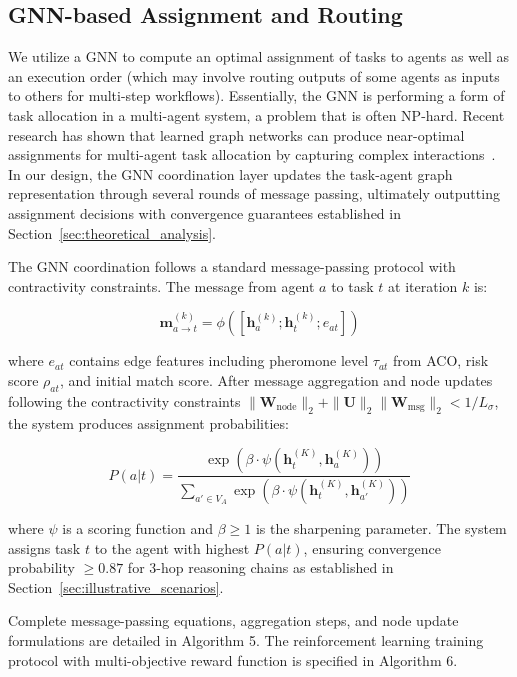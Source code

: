 \documentclass{article}
\begin{document}
\subsection{GNN-based Assignment and Routing}

We utilize a GNN to compute an optimal assignment of tasks to agents as well as an execution order (which may involve routing outputs of some agents as inputs to others for multi-step workflows). Essentially, the GNN is performing a form of task allocation in a multi-agent system, a problem that is often NP-hard. Recent research has shown that learned graph networks can produce near-optimal assignments for multi-agent task allocation by capturing complex interactions~\cite{ma2023heterogeneous,hamilton2017representation}. In our design, the GNN coordination layer updates the task-agent graph representation through several rounds of message passing, ultimately outputting assignment decisions with convergence guarantees established in Section~\ref{sec:theoretical_analysis}.

The GNN coordination follows a standard message-passing protocol with contractivity constraints. The message from agent $a$ to task $t$ at iteration $k$ is:

\begin{equation}
\mathbf{m}_{a \to t}^{(k)} = \phi([\mathbf{h}_a^{(k)}; \mathbf{h}_t^{(k)}; e_{at}]) \label{eq:gnn_message}
\end{equation}

where $e_{at}$ contains edge features including pheromone level $\tau_{at}$ from ACO, risk score $\rho_{at}$, and initial match score. After message aggregation and node updates following the contractivity constraints $\|\mathbf{W}_{\text{node}}\|_2 + \|\mathbf{U}\|_2\|\mathbf{W}_{\text{msg}}\|_2 < 1/L_\sigma$, the system produces assignment probabilities:

\begin{equation}
P(a|t) = \frac{\exp(\beta \cdot \psi(\mathbf{h}_t^{(K)}, \mathbf{h}_a^{(K)}))}{\sum_{a' \in V_A} \exp(\beta \cdot \psi(\mathbf{h}_t^{(K)}, \mathbf{h}_{a'}^{(K)}))} \label{eq:assignment_prob}
\end{equation}

where $\psi$ is a scoring function and $\beta \geq 1$ is the sharpening parameter. The system assigns task $t$ to the agent with highest $P(a|t)$, ensuring convergence probability $\geq 0.87$ for 3-hop reasoning chains as established in Section~\ref{sec:illustrative_scenarios}.

Complete message-passing equations, aggregation steps, and node update formulations are detailed in Algorithm 5. The reinforcement learning training protocol with multi-objective reward function is specified in Algorithm 6.
\end{document}
